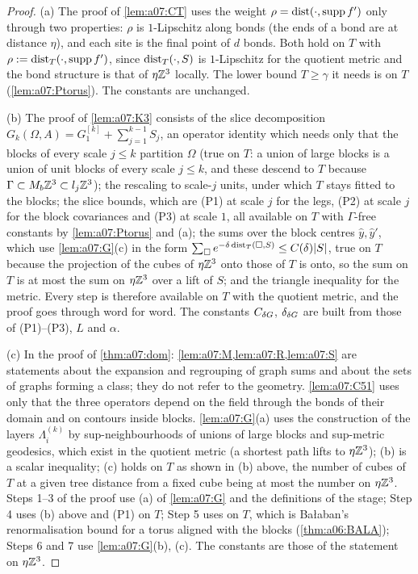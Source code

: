 \begin{proof}
(a) The proof of \cref{lem:a07:CT} uses the weight $\rho=\operatorname{dist}(\cdot,\operatorname{supp} f')$ only through two properties: $\rho$ is $1$-Lipschitz along bonds (the ends of a bond are at distance $\eta$), and each site is the final point of $d$ bonds. Both hold on $T$ with $\rho:=\operatorname{dist}_T(\cdot,\operatorname{supp} f')$, since $\operatorname{dist}_T(\cdot,S)$ is $1$-Lipschitz for the quotient metric and the bond structure is that of $\eta\mathbb Z^3$ locally. The lower bound $T\ge\gamma$ it needs is \cite[(1.8)]{Ba4} on $T$ (\cref{lem:a07:Ptorus}). The constants are unchanged.

(b) The proof of \cref{lem:a07:K3} consists of the slice decomposition $G_k(\Omega,A)=G^{[k]}_1+\sum_{j=1}^{k-1}S_j$, an operator identity which needs only that the blocks of every scale $j\le k$ partition $\Omega$ (true on $T$: a union of large blocks is a union of unit blocks of every scale $j\le k$, and these descend to $T$ because $\Gamma\subset M_b\mathbb Z^3\subset l_j\mathbb Z^3$); the rescaling to scale-$j$ units, under which $T$ stays fitted to the blocks; the slice bounds, which are (P1) at scale $j$ for the legs, (P2) at scale $j$ for the block covariances and (P3) at scale $1$, all available on $T$ with $\Gamma$-free constants by \cref{lem:a07:Ptorus} and (a); the sums over the block centres $\hat y,\hat y'$, which use \cref{lem:a07:G}(c) in the form $\sum_{\square}e^{-\delta\operatorname{dist}_T(\square,S)}\le C(\delta)|S|$, true on $T$ because the projection of the cubes of $\eta\mathbb Z^3$ onto those of $T$ is onto, so the sum on $T$ is at most the sum on $\eta\mathbb Z^3$ over a lift of $S$; and the triangle inequality for the metric. Every step is therefore available on $T$ with the quotient metric, and the proof goes through word for word. The constants $C_{\delta G}$, $\delta_{\delta G}$ are built from those of (P1)--(P3), $L$ and $\alpha$.

(c) In the proof of \cref{thm:a07:dom}: \cref{lem:a07:M,lem:a07:R,lem:a07:S} are statements about the expansion and regrouping of graph sums and about the sets of graphs forming a class; they do not refer to the geometry. \cref{lem:a07:C51} uses only that the three operators depend on the field through the bonds of their domain and on contours inside blocks. \cref{lem:a07:G}(a) uses the construction of the layers $\Lambda^{(k)}_i$ by sup-neighbourhoods of unions of large blocks and sup-metric geodesics, which exist in the quotient metric (a shortest path lifts to $\eta\mathbb Z^3$); (b) is a scalar inequality; (c) holds on $T$ as shown in (b) above, the number of cubes of $T$ at a given tree distance from a fixed cube being at most the number on $\eta\mathbb Z^3$. Steps 1--3 of the proof use (a) of \cref{lem:a07:G} and the definitions of the stage; Step 4 uses (b) above and (P1) on $T$; Step 5 uses \cite[Prop.~1, (1.33)]{Ba3} on $T$, which is Ba{\l}aban's renormalisation bound for a torus aligned with the blocks (\cref{thm:a06:BALA}); Steps 6 and 7 use \cref{lem:a07:G}(b), (c). The constants are those of the statement on $\eta\mathbb Z^3$.


\end{proof}

